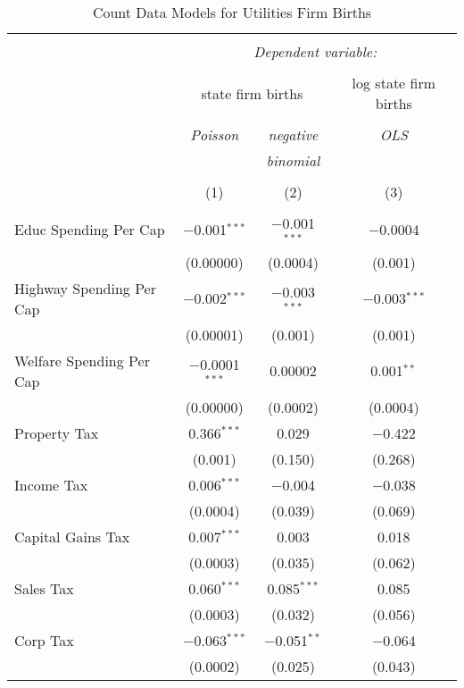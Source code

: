 
\begin{table}[!htbp] \centering 
  \caption{Count Data Models for Utilities Firm Births} 
  \label{} 
\begin{tabular}{@{\extracolsep{5pt}}lccc} 
\\[-1.8ex]\hline 
\hline \\[-1.8ex] 
 & \multicolumn{3}{c}{\textit{Dependent variable:}} \\ 
\cline{2-4} 
\\[-1.8ex] & \multicolumn{2}{c}{state firm births} & log state firm births \\ 
\\[-1.8ex] & \textit{Poisson} & \textit{negative} & \textit{OLS} \\ 
 & \textit{} & \textit{binomial} & \textit{} \\ 
\\[-1.8ex] & (1) & (2) & (3)\\ 
\hline \\[-1.8ex] 
 Educ Spending Per Cap & $-$0.001$^{***}$ & $-$0.001$^{***}$ & $-$0.0004 \\ 
  & (0.00000) & (0.0004) & (0.001) \\ 
  Highway Spending Per Cap  & $-$0.002$^{***}$ & $-$0.003$^{***}$ & $-$0.003$^{***}$ \\ 
  & (0.00001) & (0.001) & (0.001) \\ 
  Welfare Spending Per Cap  & $-$0.0001$^{***}$ & 0.00002 & 0.001$^{**}$ \\ 
  & (0.00000) & (0.0002) & (0.0004) \\ 
  Property Tax & 0.366$^{***}$ & 0.029 & $-$0.422 \\ 
  & (0.001) & (0.150) & (0.268) \\ 
  Income Tax & 0.006$^{***}$ & $-$0.004 & $-$0.038 \\ 
  & (0.0004) & (0.039) & (0.069) \\ 
  Capital Gains Tax & 0.007$^{***}$ & 0.003 & 0.018 \\ 
  & (0.0003) & (0.035) & (0.062) \\ 
  Sales Tax & 0.060$^{***}$ & 0.085$^{***}$ & 0.085 \\ 
  & (0.0003) & (0.032) & (0.056) \\ 
  Corp Tax & $-$0.063$^{***}$ & $-$0.051$^{**}$ & $-$0.064 \\ 
  & (0.0002) & (0.025) & (0.043) \\ 

\end{tabular}
\end{table}
